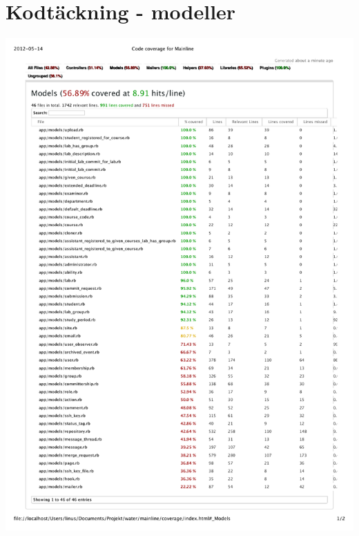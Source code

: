 \chapter{Kodtäckning - modeller}
\pagebreak
\centering
\includegraphics[width=16.5cm]{fig/code-coverage/code-coverage.pdf}
